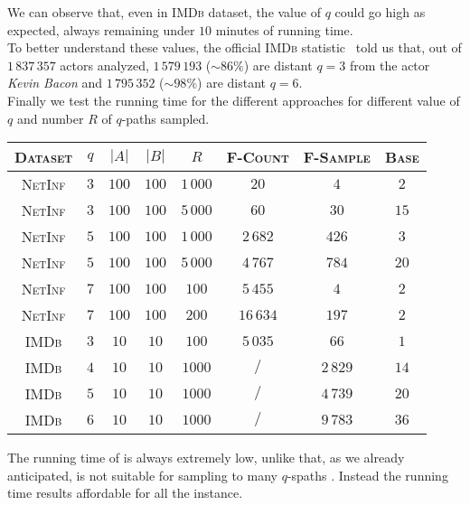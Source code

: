 	We can observe that, even in \textsc{IMDb} dataset, the value of $q$ could go high as expected, always remaining under $10$ minutes of running time. \\
	
	To better understand these values, the official \textsc{IMDb} statistic~\cite{imdbstat} told us that, out of $1\,837\,357$ actors analyzed, $1\,579\,193$ ($\sim86\%$) are distant $q=3$ from the actor \textit{Kevin Bacon} and $1\,795\,352$ ($\sim98\%$) are distant $q=6$.\\
	
	Finally we test the running time for the different approaches for different value of $q$ and number $R$ of $q$-paths sampled. 
	
	
	\begin{table}[h]
		\centering
		\label{my-label}
		\begin{tabular}{|c|c|c|c|c|c|c|c|}
			\hline
			\textsc{Dataset}       & $q$  & $|A|$ & $|B|$ & $R$ & \textsc{F-Count} & \textsc{F-Sample} & \textsc{Base} \\ \hline \hline
			\textsc{NetInf} & $3$  & $100$ & $100$ & $1\,000$ & $20$ & $4$ & $2$ \\ \hline
			\textsc{NetInf} & $3$  & $100$ & $100$ & $5\,000$ & $60$ & $30$ & $15$ \\ \hline
			\textsc{NetInf} & $5$  & $100$ & $100$ & $1\,000$ & $2\,682$ & $426$ & $3$ \\ \hline
			\textsc{NetInf} & $5$  & $100$ & $100$ & $5\,000$ & $4\,767$ & $784$ & $20$ \\ \hline
			\textsc{NetInf} & $7$  & $100$ & $100$ & $100$ & $5\,455$ & $4$ & $2$ \\ \hline
			\textsc{NetInf} & $7$  & $100$ & $100$ & $200$ & $16\,634$ & $197$ & $2$ \\ \hline \hline
			\textsc{IMDb}   & $3$  & $10$ & $10$ & $100$ & $5\,035$ & $66$ & $1$ \\ \hline
			\textsc{IMDb}   & $4$  & $10$ & $10$ & $1000$ & $/$ & $2\,829$ & $14$ \\ \hline
			\textsc{IMDb}   & $5$  & $10$ & $10$ & $1000$ & $/$ & $4\,739$ & $20$ \\ \hline
			\textsc{IMDb}   & $6$  & $10$ & $10$ & $1000$ & $/$ & $9\,783$ & $36$ \\ \hline
			
		\end{tabular}
	\end{table}
	
	The running time of \base is always extremely low, 
	unlike \fcount that, as we already anticipated, is not suitable for sampling to many $q$-spaths .
	Instead the running time \fsamp results affordable for all the instance. 
	
